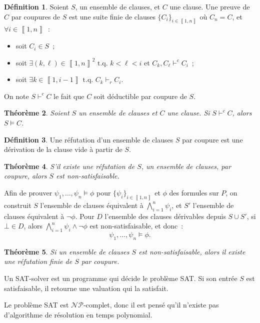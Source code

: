 \documentclass{article}
\newtheorem{thm}{Théorème}[section]
\theoremstyle{definition}
\newtheorem{déf}[thm]{Définition}
\theoremstyle{remark}
\newcommand{\intint}[2]{\left\llbracket#1, #2\right\rrbracket}
\newcommand{\tq}{\text{ t.q. }}
\newcommand{\NP}{\mathcal {NP}}
\begin{document}
	\begin{déf} Soient $S$, un ensemble de clauses, et $C$ une clause. Une preuve de $C$ par coupures de $S$ est une suite finie de clauses $\{C_i\}_{i \in \intint 1n}$
	où $C_n = C$, et $\forall i \in \intint 1n$~:
	\begin{itemize}
		\item soit $C_i \in S$~;
		\item soit $\exists (k, \ell) \in \intint 1n^2 \tq k < \ell < i$ et $C_k,C_\ell \vdash^c C_i$~;
		\item soit $\exists k \in \intint 1{i-1} \tq C_k \vdash_r C_i$.
	\end{itemize}

	On note $S \vdash^c C$ le fait que $C$ soit déductible par coupure de $S$.
	\end{déf}

	\begin{thm} Soient $S$ un ensemble de clauses et $C$ une clause. Si $S \vdash^c C$, alors $S \models C$.
	\end{thm}

	\begin{déf} Une réfutation d'un ensemble de clauses $S$ par coupure est une dérivation de la clause vide à partir de $S$.
	\end{déf}

	\begin{thm} S'il existe une réfutation de $S$, un ensemble de clauses, par coupure, alors $S$ est non-satisfaisable.
	\end{thm}

	Afin de prouver $\psi_1, \ldots, \psi_n \models \phi$ pour $\{\psi_i\}_{i \in \intint 1n}$ et $\phi$ des formules sur $P$, on construit $S$
	l'ensemble de clauses équivalent à $\bigwedge_{i=1}^n\psi_i$, et $S'$ l'ensemble de clauses équivalent à $\lnot \phi$. Pour $D$ l'ensemble
	des clauses dérivables depuis $S \cup S'$, si $\bot \in D$, alors $\bigwedge_{i=1}^n\psi_i \land \lnot \phi$ est non-satisfaisable, et donc~:
	\[\psi_1, \ldots, \psi_n \models \phi.\]

	\begin{thm} Si un ensemble de clauses $S$ est non-satisfaisable, alors il existe une réfutation finie de $S$ par coupure.
	\end{thm}

	Un SAT-solver est un programme qui décide le problème SAT. Si son entrée $S$ est satisfaisable, il retourne une valuation qui la satisfait.

	Le problème SAT est $\NP$-complet, donc il est pensé qu'il n'existe pas d'algorithme de résolution en temps polynomial.
\end{document}
